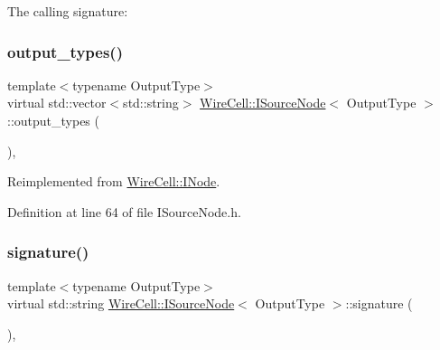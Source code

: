 The calling signature\+: 

\mbox{\label{class_wire_cell_1_1_i_source_node_a37037cdba0b75cf5fa50751000a4f436}} 
\subsubsection{\texorpdfstring{output\+\_\+types()}{output\_types()}}
{\footnotesize\ttfamily template$<$typename Output\+Type$>$ \\
virtual std\+::vector$<$std\+::string$>$ \hyperlink{class_wire_cell_1_1_i_source_node}{Wire\+Cell\+::\+I\+Source\+Node}$<$ Output\+Type $>$\+::output\+\_\+types (\begin{DoxyParamCaption}{ }\end{DoxyParamCaption})\hspace{0.3cm}{\ttfamily [inline]}, {\ttfamily [virtual]}}



Reimplemented from \hyperlink{class_wire_cell_1_1_i_node_aba7e537684cb4f2453796ff73da2d602}{Wire\+Cell\+::\+I\+Node}.



Definition at line 64 of file I\+Source\+Node.\+h.

\mbox{\label{class_wire_cell_1_1_i_source_node_a9361f7cad35e087800c5e59f27939977}} 
\subsubsection{\texorpdfstring{signature()}{signature()}}
{\footnotesize\ttfamily template$<$typename Output\+Type$>$ \\
virtual std\+::string \hyperlink{class_wire_cell_1_1_i_source_node}{Wire\+Cell\+::\+I\+Source\+Node}$<$ Output\+Type $>$\+::signature (\begin{DoxyParamCaption}{ }\end{DoxyParamCaption})\hspace{0.3cm}{\ttfamily [inline]}, {\ttfamily [virtual]}}



